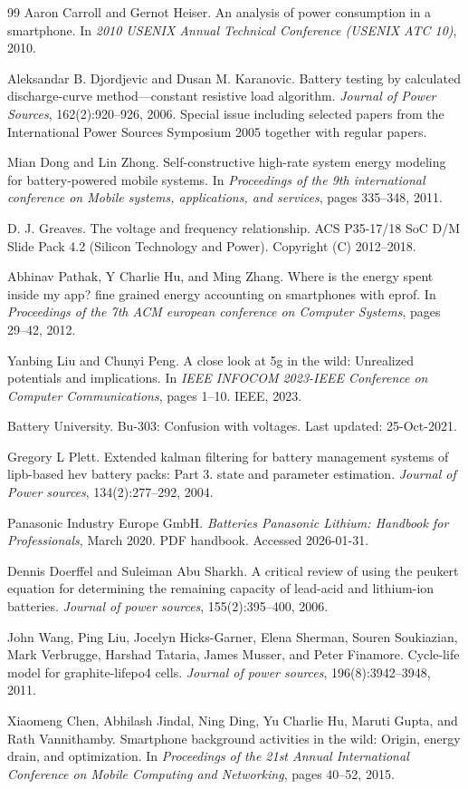 \documentclass[11pt,a4paper]{ctexart}
\begin{document}
\begin{thebibliography}{99}
 Aaron Carroll and Gernot Heiser. An analysis of power consumption in a smartphone. In \emph{2010 USENIX Annual Technical Conference (USENIX ATC 10)}, 2010.

 Aleksandar B. Djordjevic and Dusan M. Karanovic. Battery testing by calculated discharge-curve method---constant resistive load algorithm. \emph{Journal of Power Sources}, 162(2):920--926, 2006. Special issue including selected papers from the International Power Sources Symposium 2005 together with regular papers.

 Mian Dong and Lin Zhong. Self-constructive high-rate system energy modeling for battery-powered mobile systems. In \emph{Proceedings of the 9th international conference on Mobile systems, applications, and services}, pages 335--348, 2011.

 D. J. Greaves. The voltage and frequency relationship. ACS P35-17/18 SoC D/M Slide Pack 4.2 (Silicon Technology and Power). Copyright (C) 2012--2018.

 Abhinav Pathak, Y Charlie Hu, and Ming Zhang. Where is the energy spent inside my app? fine grained energy accounting on smartphones with eprof. In \emph{Proceedings of the 7th ACM european conference on Computer Systems}, pages 29--42, 2012.

 Yanbing Liu and Chunyi Peng. A close look at 5g in the wild: Unrealized potentials and implications. In \emph{IEEE INFOCOM 2023-IEEE Conference on Computer Communications}, pages 1--10. IEEE, 2023.

 Battery University. Bu-303: Confusion with voltages. Last updated: 25-Oct-2021.

 Gregory L Plett. Extended kalman filtering for battery management systems of lipb-based hev battery packs: Part 3. state and parameter estimation. \emph{Journal of Power sources}, 134(2):277--292, 2004.

 Panasonic Industry Europe GmbH. \emph{Batteries Panasonic Lithium: Handbook for Professionals}, March 2020. PDF handbook. Accessed 2026-01-31.

 Dennis Doerffel and Suleiman Abu Sharkh. A critical review of using the peukert equation for determining the remaining capacity of lead-acid and lithium-ion batteries. \emph{Journal of power sources}, 155(2):395--400, 2006.

 John Wang, Ping Liu, Jocelyn Hicks-Garner, Elena Sherman, Souren Soukiazian, Mark Verbrugge, Harshad Tataria, James Musser, and Peter Finamore. Cycle-life model for graphite-lifepo4 cells. \emph{Journal of power sources}, 196(8):3942--3948, 2011.

 Xiaomeng Chen, Abhilash Jindal, Ning Ding, Yu Charlie Hu, Maruti Gupta, and Rath Vannithamby. Smartphone background activities in the wild: Origin, energy drain, and optimization. In \emph{Proceedings of the 21st Annual International Conference on Mobile Computing and Networking}, pages 40--52, 2015.
\end{thebibliography}
\end{document}
